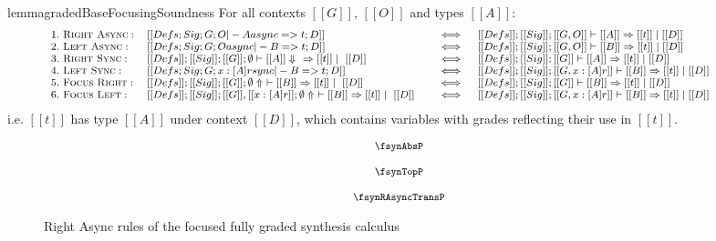 \begin{restatable}{lemma}{gradedBaseFocusingSoundness}
  For all contexts $[[ G ]]$, $[[ O ]]$ and types $[[ A ]]$:
  \begin{align*}
    {\footnotesize{
  \hspace{-3.5em}\begin{array}{lll}
   1.\ \textsc{Right Async}: & [[ Defs ; Sig; G ; O |- A async => t ; D ]] \quad &\iff \quad [[ Defs ]] ; [[ Sig ]] ; [[ G , O ]] \vdash [[ A ]] \Rightarrow [[ t ]] \mid [[ D ]]\\
   2.\ \textsc{Left Async}: & [[ Defs ; Sig; G ; O async |- B => t ; D ]] \quad &\iff \quad [[ Defs ]] ; [[ Sig ]]  ; [[ G , O ]] \vdash [[ B ]] \Rightarrow [[ t ]] \mid [[ D ]]\\
   3.\ \textsc{Right Sync}: & [[ Defs ]] ; [[ Sig ]] ; [[ G ]] ; \emptyset \vdash [[ A ]] \Downarrow\ \ \Rightarrow [[ t ]] \mid\  [[ D ]] \quad &\iff \quad [[ Defs ]] ; [[ Sig ]] ; [[ G ]] \vdash [[ A ]] \Rightarrow [[ t ]] \mid [[ D ]]\\
   4.\ \textsc{Left Sync}: & [[ Defs ; Sig ; G ; {x : [A] r} sync |- B => t ; D ]] \quad &\iff \quad [[ Defs ]] ; [[ Sig ]] ; [[ G, x : [ A] r ]] \vdash [[ B ]] \Rightarrow [[ t ]] \mid [[ D ]]\\
   5.\ \textsc{Focus Right}: & [[ Defs ]] ; [[ Sig ]] ; [[ G ]] ; \emptyset \Uparrow\ \vdash [[ B]] \Rightarrow [[ t]] \mid\ [[ D ]] \quad &\iff \quad [[ Defs ]] ; [[ Sig ]] ;  [[ G ]] \vdash [[ B ]] \Rightarrow [[ t ]] \mid [[ D ]]\\
   6.\ \textsc{Focus Left}: & [[ Defs ]] ; [[ Sig ]]; [[ G ]], [[ x : [A] r ]] ; \emptyset \Uparrow\ \vdash [[ B]] \Rightarrow [[t ]] \mid\ [[ D ]] \quad &\iff \quad [[ Defs ]] ; [[ Sig ]] ; [[ G, x : [A ] r ]] \vdash [[ B ]] \Rightarrow [[ t ]] \mid [[ D ]]
  \end{array}
    }}
  \end{align*}
i.e. $[[ t ]]$ has type $[[ A ]]$
under context $[[ D ]]$,
which contains variables with grades reflecting their use in $[[ t ]]$.
\label{lemma:graded-focus-sound}
  \end{restatable}

  \begin{figure}[H]
    \begin{align*}
      {\footnotesize{
  \begin{array}{c}
      \fsynAbsP
      \\[1.25em]
      \fsynTopP
      \\[1.25em]
      \fsynRAsyncTransP
    \end{array}
      }}
    \end{align*}
    \caption{Right Async rules of the focused fully graded synthesis calculus}
    \label{fig:focus-graded-right-async}
  \end{figure}

